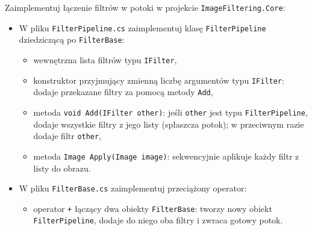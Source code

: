 \documentclass[11pt,a4paper,addpoints]{exam}
\begin{document}
\begin{questions}
\question[2]
Zaimplementuj łączenie filtrów w potoki w projekcie \texttt{ImageFiltering.Core}:
\begin{itemize}
    \item W pliku \texttt{FilterPipeline.cs} zaimplementuj klasę \texttt{FilterPipeline} dziedziczącą po \texttt{FilterBase}:
    \begin{itemize}
        \item wewnętrzna lista filtrów typu \texttt{IFilter},
        \item konstruktor przyjmujący zmienną liczbę argumentów typu \texttt{IFilter}: dodaje przekazane filtry za pomocą metody \texttt{Add},
        \item metoda \texttt{void Add(IFilter other)}: jeśli \texttt{other} jest typu \texttt{FilterPipeline}, dodaje wszystkie filtry z jego listy (spłaszcza potok); w przeciwnym razie dodaje filtr \texttt{other},
        \item metoda \texttt{Image Apply(Image image)}: sekwencyjnie aplikuje każdy filtr z listy do obrazu.
    \end{itemize}

    \item W pliku \texttt{FilterBase.cs} zaimplementuj przeciążony operator:
    \begin{itemize}
        \item operator \texttt{+} łączący dwa obiekty \texttt{FilterBase}: tworzy nowy obiekt \texttt{FilterPipeline}, dodaje do niego oba filtry i zwraca gotowy potok.
    \end{itemize}
\end{itemize}

\end{questions}
\end{document}
